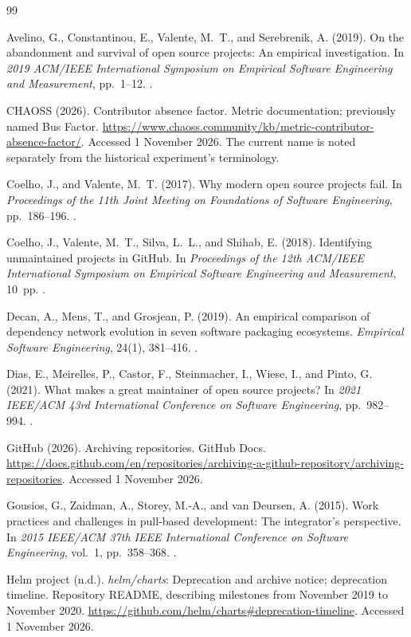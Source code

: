 \begin{thebibliography}{99}
\label{refs:chapter08}

Avelino, G., Constantinou, E., Valente, M.~T., and Serebrenik, A. (2019).
On the abandonment and survival of open source projects: An empirical investigation.
In \emph{2019 ACM/IEEE International Symposium on Empirical Software Engineering and Measurement}, pp.~1--12.
.

CHAOSS (2026).
Contributor absence factor. Metric documentation; previously named Bus Factor.
\url{https://www.chaoss.community/kb/metric-contributor-absence-factor/}.
Accessed 1 November 2026. The current name is noted separately from the historical experiment's terminology.

Coelho, J., and Valente, M.~T. (2017).
Why modern open source projects fail.
In \emph{Proceedings of the 11th Joint Meeting on Foundations of Software Engineering}, pp.~186--196.
.

Coelho, J., Valente, M.~T., Silva, L.~L., and Shihab, E. (2018).
Identifying unmaintained projects in GitHub.
In \emph{Proceedings of the 12th ACM/IEEE International Symposium on Empirical Software Engineering and Measurement}, 10~pp.
.

Decan, A., Mens, T., and Grosjean, P. (2019).
An empirical comparison of dependency network evolution in seven software packaging ecosystems.
\emph{Empirical Software Engineering}, 24(1), 381--416.
.

Dias, E., Meirelles, P., Castor, F., Steinmacher, I., Wiese, I., and Pinto, G. (2021).
What makes a great maintainer of open source projects?
In \emph{2021 IEEE/ACM 43rd International Conference on Software Engineering}, pp.~982--994.
.

GitHub (2026).
Archiving repositories. GitHub Docs.
\url{https://docs.github.com/en/repositories/archiving-a-github-repository/archiving-repositories}.
Accessed 1 November 2026.

Gousios, G., Zaidman, A., Storey, M.-A., and van Deursen, A. (2015).
Work practices and challenges in pull-based development: The integrator's perspective.
In \emph{2015 IEEE/ACM 37th IEEE International Conference on Software Engineering}, vol.~1, pp.~358--368.
.

Helm project (n.d.).
\emph{helm/charts}: Deprecation and archive notice; deprecation timeline.
Repository README, describing milestones from November 2019 to November 2020.
\url{https://github.com/helm/charts#deprecation-timeline}.
Accessed 1 November 2026.

\end{thebibliography}
